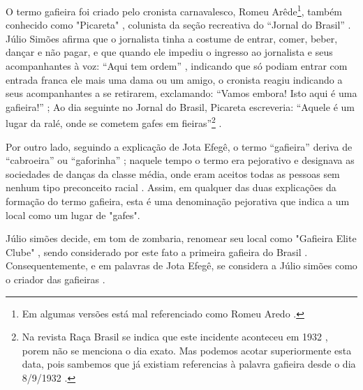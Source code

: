 O termo gafieira foi criado pelo cronista carnavalesco, 
Romeu Arêde\footnote{Em algumas versões está mal referenciado como Romeu Aredo \cite[pp. 188]{raca1999}.}, 
também conhecido como "Picareta" \cite[pp. 3]{juliosimoes} \cite[pp. 21]{efege1974maxixe} \cite[pp. 78]{coutinho2006cronistas}, 
colunista da seção recreativa do ``Jornal do Brasil'' \cite[pp. 18]{entrevistajuliojournalbrasil1}.
Júlio Simões afirma que o jornalista tinha a costume de entrar, comer, beber, dançar e não pagar,
e que quando ele impediu o ingresso ao jornalista e seus acompanhantes à voz: ``Aqui tem ordem'' \cite[pp.13 ]{respeitojournalbrasil1},
indicando que só podiam entrar com entrada franca ele mais uma dama ou um amigo,
o cronista reagiu indicando a seus acompanhantes a se retirarem, exclamando: 
``Vamos embora! Isto aqui é uma gafieira!'' \cite[pp. 29]{instituto1987revista};
Ao dia seguinte no Jornal do Brasil, Picareta escreveria:
``Aquele é um lugar da ralé, onde se cometem gafes em fieiras''\footnote{Na 
revista Raça Brasil se indica que este incidente aconteceu em 1932 \cite[pp. 188]{raca1999}, 
porem não se menciona o dia exato. 
Mas podemos acotar superiormente esta data, 
pois sambemos que já existiam referencias à palavra gafieira desde o dia 8/9/1932 \cite[pp. 12]{gafieirajournaloradical1}.} 
\cite[pp. 188]{raca1999}.


Por outro lado, seguindo a explicação de Jota Efegê, 
o termo ``gafieira'' deriva de ``cabroeira'' ou ``gaforinha'' \cite[pp. 3]{juliosimoes};
naquele tempo o termo era pejorativo e designava as sociedades de danças da classe média,
onde eram aceitos todas as pessoas sem nenhum tipo preconceito racial \cite[pp. 18]{entrevistajuliojournalbrasil1}.
Assim, em qualquer das duas explicações da formação do termo gafieira, 
esta é uma denominação pejorativa que indica a um local como um lugar de "gafes".

Júlio simões decide, em tom de zombaria, renomear seu local como "Gafieira Elite Clube" \cite[pp. 79]{moura1995tia},
sendo considerado por este fato a primeira gafieira do Brasil \cite{cabral2016elisete} \cite[pp. 84]{cabral1996escolas}.
Consequentemente, e em palavras de Jota Efegê, 
se considera a Júlio simões como o criador das gafieiras \cite[pp. 3]{juliosimoes}.

